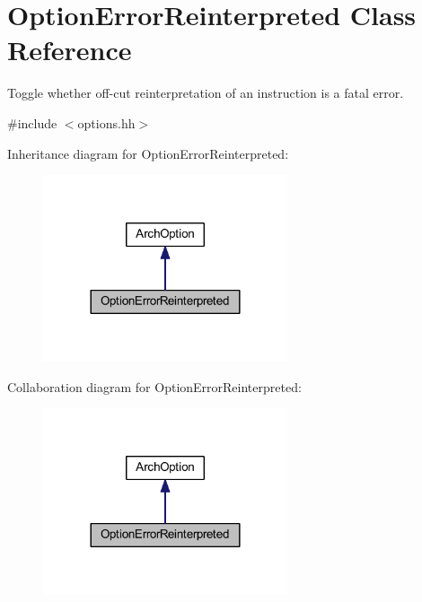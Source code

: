 \hypertarget{class_option_error_reinterpreted}{}\section{Option\+Error\+Reinterpreted Class Reference}
\label{class_option_error_reinterpreted}


Toggle whether off-\/cut reinterpretation of an instruction is a fatal error.  




{\ttfamily \#include $<$options.\+hh$>$}



Inheritance diagram for Option\+Error\+Reinterpreted\+:
\nopagebreak
\begin{figure}[H]
\begin{center}
\leavevmode
\includegraphics[width=204pt]{class_option_error_reinterpreted__inherit__graph}
\end{center}
\end{figure}


Collaboration diagram for Option\+Error\+Reinterpreted\+:
\nopagebreak
\begin{figure}[H]
\begin{center}
\leavevmode
\includegraphics[width=204pt]{class_option_error_reinterpreted__coll__graph}
\end{center}
\end{figure}
